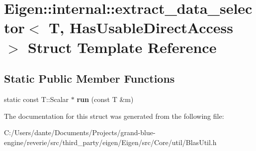 \hypertarget{struct_eigen_1_1internal_1_1extract__data__selector}{}\section{Eigen\+::internal\+::extract\+\_\+data\+\_\+selector$<$ T, Has\+Usable\+Direct\+Access $>$ Struct Template Reference}
\label{struct_eigen_1_1internal_1_1extract__data__selector}
\subsection*{Static Public Member Functions}
\begin{DoxyCompactItemize}
\item 
\mbox{\label{struct_eigen_1_1internal_1_1extract__data__selector_a5e4c8df8b5b38f6787b61035b5118d77}} 
static const T\+::\+Scalar $\ast$ {\bfseries run} (const T \&m)
\end{DoxyCompactItemize}


The documentation for this struct was generated from the following file\+:\begin{DoxyCompactItemize}
\item 
C\+:/\+Users/dante/\+Documents/\+Projects/grand-\/blue-\/engine/reverie/src/third\+\_\+party/eigen/\+Eigen/src/\+Core/util/Blas\+Util.\+h\end{DoxyCompactItemize}
